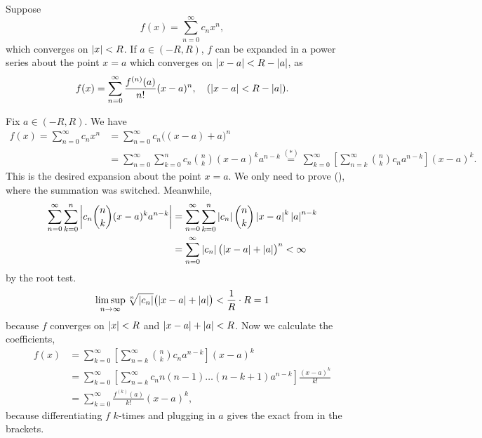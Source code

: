 \pagebreak

 Suppose
\[
    f(x) = \sum_{n=0}^\infty c_n x^n,
\]
which converges on \(\left| x \right| < R\). If \(a \in (-R, R)\), \(f\) can be expanded in a power series about the point \(x = a\) which converges on \(\left| x-a \right| < R - \left| a \right|\), as
\[
    f(x) = \sum_{n=0}^\infty \frac{f^{(n)}(a)}{n!}(x-a)^n, \quad (\left| x-a \right| < R - \left| a \right|).
\]

\pf Fix \(a \in (-R, R)\).
We have
\[
    \begin{aligned}
        f(x) = \sum_{n=0}^\infty c_n x^n & = \sum_{n=0}^\infty c_n \bigl((x-a) + a \bigr)^n                                                                                                                        \\
                                         & = \sum_{n=0}^\infty \sum_{k=0}^n c_n {n \choose k}(x-a)^k a^{n-k} \overset{(\ast)}{=} \sum_{k=0}^\infty \left[\sum_{n=k}^\infty {n\choose k} c_n a^{n-k}\right](x-a)^k.
    \end{aligned}
\]
This is the desired expansion about the point \(x = a\). We only need to prove (\mast), where the summation was switched. Meanwhile,
\[
    \begin{aligned}
        \sum_{n=0}^\infty \sum_{k=0}^n \left| c_n {n \choose k}(x-a)^k a^{n-k} \right| & = \sum_{n=0}^\infty \sum_{k=0}^n \left| c_n \right| {n \choose k} \left| x-a \right|^k \left| a \right|^{n-k} \\
                                                                              & = \sum_{n=0}^\infty \left| c_n \right| \bigl(\left| x-a \right|+\left| a \right|\bigr)^n < \infty
    \end{aligned}
\]
by the root test.
\[
    \limsup_{n\rightarrow\infty} \sqrt[n]{\left| c_n \right|}\bigl(\left| x-a \right| + \left| a \right|\bigr) < \frac{1}{R}\cdot R = 1
\]
because \(f\) converges on \(\left| x \right| < R\) and \(\left| x-a \right|+\left| a \right| < R\). Now we calculate the coefficients,
\[
    \begin{aligned}
        f(x) & = \sum_{k=0}^\infty \left[\sum_{n=k}^\infty {n\choose k} c_n a^{n-k}\right](x-a)^k                    \\
             & = \sum_{k=0}^\infty \left[\sum_{n=k}^\infty c_n n(n-1)\dots (n-k+1) a^{n-k}\right] \frac{(x-a)^k}{k!} \\
             & = \sum_{k=0}^\infty \frac{f^{(k)}(a)}{k!}(x-a)^k,
    \end{aligned}
\]
because differentiating \(f\) \(k\)-times and plugging in \(a\) gives the exact from in the brackets.

